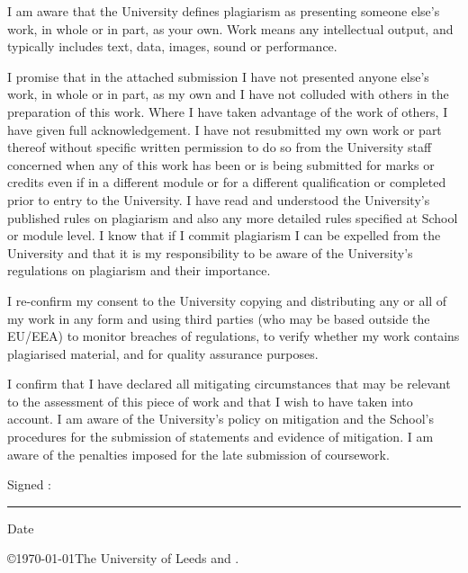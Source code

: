 
\begin{ipstatement} %

{\footnotesize  I am aware that the University defines plagiarism as presenting someone else’s work, in whole or in part, as your own. Work means any intellectual output, and typically includes text, data, images, sound or performance.

I promise that in the attached submission I have not presented anyone else’s work, in whole or in part, as my own and I have not colluded with others in the preparation of this work. Where I have taken advantage of the work of others, I have given full acknowledgement. I have not resubmitted my own work or part thereof without specific written permission to do so from the University staff concerned when any of this work has been or is being submitted for marks or credits even if in a different module or for a different qualification or completed prior to entry to the University. I have read and understood the
University's published rules on plagiarism and also any more detailed rules specified at School or module level. I know that if I commit plagiarism I can be expelled from the University and that it is my responsibility to be aware of the University’s regulations on plagiarism and their importance.

I re-confirm my consent to the University copying and distributing any or all of my work in any form and using third parties (who may be based outside the EU/EEA) to monitor breaches of regulations, to verify whether my work contains plagiarised material, and for quality assurance purposes.

I confirm that I have declared all mitigating circumstances that may be relevant to the assessment of this piece of work and that I wish to have taken into account. I am aware of the University's policy on mitigation and the School's procedures for the submission of statements and evidence of mitigation. I am aware of the penalties imposed for the late submission of coursework.}

\vspace{1cm}

{\large Signed :\space}\rule{7cm}{0.2pt}{\large \space Date}\hrulefill\\
\hspace*{1.5cm}\theAuthor

\vspace{1cm}

\copyright \yeardate\today The University of Leeds and \theAuthor.

\end{ipstatement}


